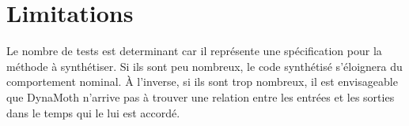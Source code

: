 \chapter{Limitations}
	\thispagestyle{limitation}
	
\par Le nombre de tests est determinant car il représente une spécification pour la méthode à synthétiser. Si ils sont peu nombreux, le code synthétisé s'éloignera du comportement nominal. À l'inverse, si ils sont trop nombreux, il est envisageable que DynaMoth n'arrive pas à trouver une relation entre les entrées et les sorties dans le temps qui le lui est accordé.
